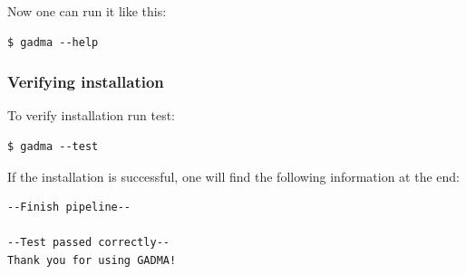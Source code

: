 \documentclass[12pt]{article}
\begin{document}
Now one can run it like this:
\begin{lstlisting}
$ gadma --help
\end{lstlisting}

\subsubsection{Verifying installation}
To verify installation run test:

\begin{lstlisting}
$ gadma --test
\end{lstlisting}

If the installation is successful, one will find the following information at the end:
\begin{lstlisting}
--Finish pipeline--

--Test passed correctly--
Thank you for using GADMA!
\end{lstlisting}
\end{document}
